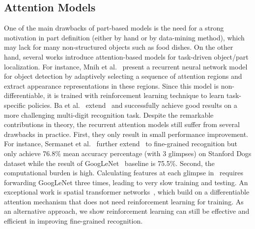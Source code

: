 \documentclass[10pt,twocolumn,letterpaper]{article}
\begin{document}
\subsection{Attention Models}
One of the main drawbacks of part-based models is the need for a strong motivation in part definition (either by hand or by data-mining method), which may lack for many non-structured objects such as food dishes.
On the other hand, several works introduce attention-based models for task-driven object/part localization.
For instance, Mnih et al.~\cite{bd1} present a recurrent neural network model for object detection by adaptively selecting a sequence of attention regions and extract appearance representations in these regions.
Since this model is non-differentiable, it is trained with reinforcement learning technique to learn task-specific policies.
Ba et al.~\cite{bd2} extend~\cite{bd1} and successfully achieve good results on a more challenging multi-digit recognition task.
Despite the remarkable contributions in theory, the recurrent attention models still suffer from several drawbacks in practice.
First, they only result in small performance improvement.
For instance, Sermanet et al.~\cite{bd3} further extend~\cite{bd2} to fine-grained recognition but only achieve 76.8\% mean accuracy percentage (with 3 glimpses) on Stanford Dogs dataset while the result of GoogLeNet~\cite{bd7} baseline is 75.5\%.
Second, the computational burden is high.
Calculating features at each glimpse in~\cite{bd3} requires forwarding GoogLeNet three times, leading to very slow training and testing.
An exceptional work is spatial transformer networks~\cite{jaderberg2015spatial}, which build on a differentiable attention mechanism that does not need reinforcement learning for training.
As an alternative approach, we show reinforcement learning can still be effective and efficient in improving fine-grained recognition.
\end{document}
